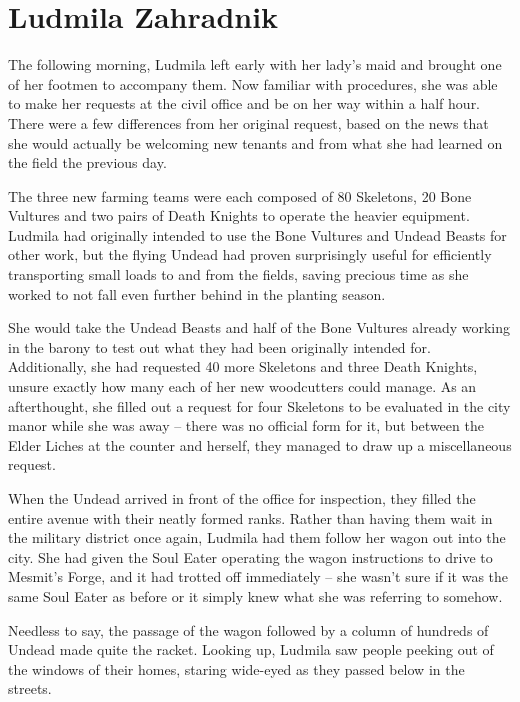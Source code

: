 \chapter{Ludmila Zahradnik}

The following morning, Ludmila left early with her lady’s maid and brought one of her footmen to accompany them. Now familiar with procedures, she was able to make her requests at the civil office and be on her way within a half hour. There were a few differences from her original request, based on the news that she would actually be welcoming new tenants and from what she had learned on the field the previous day.

 

The three new farming teams were each composed of 80 Skeletons, 20 Bone Vultures and two pairs of Death Knights to operate the heavier equipment. Ludmila had originally intended to use the Bone Vultures and Undead Beasts for other work, but the flying Undead had proven surprisingly useful for efficiently transporting small loads to and from the fields, saving precious time as she worked to not fall even further behind in the planting season.

 

She would take the Undead Beasts and half of the Bone Vultures already working in the barony to test out what they had been originally intended for. Additionally, she had requested 40 more Skeletons and three Death Knights, unsure exactly how many each of her new woodcutters could manage. As an afterthought, she filled out a request for four Skeletons to be evaluated in the city manor while she was away – there was no official form for it, but between the Elder Liches at the counter and herself, they managed to draw up a miscellaneous request.

 

When the Undead arrived in front of the office for inspection, they filled the entire avenue with their neatly formed ranks. Rather than having them wait in the military district once again, Ludmila had them follow her wagon out into the city. She had given the Soul Eater operating the wagon instructions to drive to Mesmit’s Forge, and it had trotted off immediately – she wasn’t sure if it was the same Soul Eater as before or it simply knew what she was referring to somehow.

 

Needless to say, the passage of the wagon followed by a column of hundreds of Undead made quite the racket. Looking up, Ludmila saw people peeking out of the windows of their homes, staring wide-eyed as they passed below in the streets.

